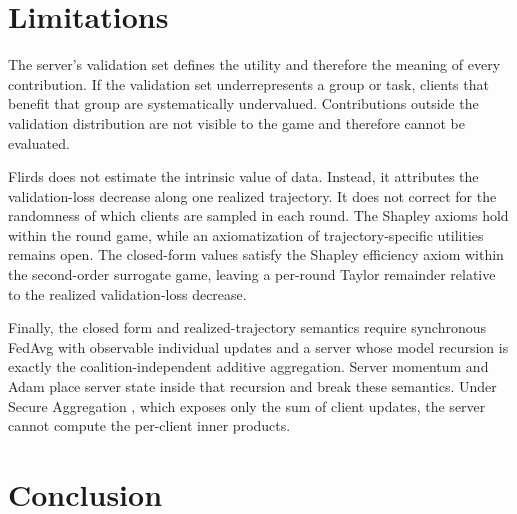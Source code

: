 \documentclass[letterpaper]{article} %
\theoremstyle{definition} %
\newcommand{\djh}[1]{{\leavevmode\color{magenta}[DJ: #1]}}
\newcommand{\cyh}[1]{{\leavevmode\color{blue}[YH: #1]}}
\begin{document}
\section{Limitations}
\label{sec:limitations}

The server's validation set defines the utility and therefore the meaning of
every contribution. If the validation set underrepresents a group or task,
clients that benefit that group are systematically undervalued. Contributions
outside the validation distribution are not visible to the game and therefore
cannot be evaluated.

Flirds does not estimate the intrinsic value of data. Instead, it attributes
the validation-loss decrease along one realized trajectory. It does not
correct for the randomness of which clients are sampled in each round. The
Shapley axioms hold within the round game, while an axiomatization of
trajectory-specific utilities remains open. The closed-form values satisfy the
Shapley efficiency axiom within the second-order surrogate game, leaving a
per-round Taylor remainder relative to the realized validation-loss decrease.

Finally, the closed form and realized-trajectory semantics require synchronous FedAvg with observable individual updates and a server whose model recursion is exactly the coalition-independent additive aggregation. Server momentum and Adam place server state inside that recursion and break these semantics. Under Secure Aggregation \citep{bonawitz2017practical}, which exposes only the sum of client updates, the server cannot compute the per-client inner products.

\section{Conclusion}
\label{sec:conclusion}

\end{document}
